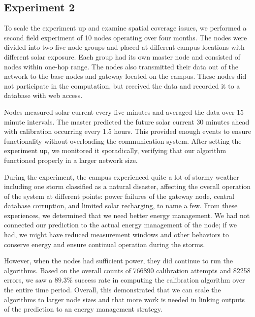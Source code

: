 \documentclass[prodmode,acmtosn]{acmsmall}
\begin{document}
\subsection{Experiment 2}
To scale the experiment up and examine spatial coverage issues, we performed a second field experiment of 10 nodes operating over four months.
The nodes were divided into two five-node groups and placed at different campus locations with different solar exposure.
Each group had its own master node and consisted of nodes within one-hop range.
The nodes also transmitted their data out of the network to the base nodes and gateway located on the campus.
These nodes did not participate in the computation, but received the data and recorded it to a database with web access.

Nodes measured solar current every five minutes and averaged the data over 15 minute intervals.
The master predicted the future solar current 30 minutes ahead with calibration occurring every 1.5 hours.
This provided enough events to ensure functionality without overloading the communication system.
After setting the experiment up, we monitored it sporadically, verifying that our algorithm functioned properly in a larger network size.

During the experiment, the campus experienced quite a lot of stormy weather including one storm classified as a natural disaster, affecting the overall operation of the system at different points: power failures of the gateway node, central database corruption, and limited solar recharging, to name a few.
From these experiences, we determined that we need better energy management.
We had not connected our prediction to the actual energy management of the node; if we had, we might have reduced measurement windows and other behaviors to conserve energy and ensure continual operation during the storms.

However, when the nodes had sufficient power, they did continue to run the algorithms.
Based on the overall counts of 766890 calibration attempts and 82258 errors, we saw a $89.3\%$ success rate in computing the calibration algorithm over the entire time period.
Overall, this demonstrated that we can scale the algorithms to larger node sizes and that more work is needed in linking outputs of the prediction to an energy management strategy. \newline
\end{document}
